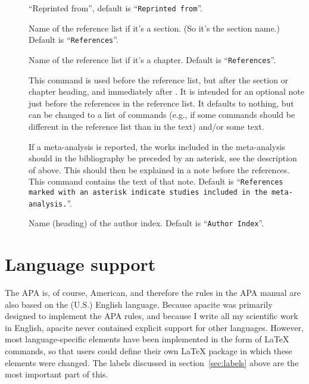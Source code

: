 \documentclass{article}
\newcommand{\pkg}[1]{\textsf{#1}}%
\newcommand{\cmd}[1]{\texttt{\string#1}}%
\begin{document}
\begin{description}
  \item[\cmd{\BREPR}] ``Reprinted from'', default is
      ``\texttt{Reprinted from}''.

  \item[\cmd{\refname}] Name of the reference list if it's a section.
      (So it's the section name.) Default is ``\verb+References+''.

  \item[\cmd{\bibname}] Name of the reference list if it's a chapter.
      Default is ``\verb+References+''.

  \item[\cmd{\bibliographyprenote}] This command is used before
      the reference list, but after the section or chapter heading,
      and immediately after \cmd{\bibliographytypesize}.
      It is intended for an optional note just before the references
      in the reference list. It defaults to nothing, but can be changed
      to a list of commands (e.g., if some commands should be different
      in the reference list than in the text) and/or some text.

  \item[\cmd{\APACmetaprenote}] If a meta-analysis is reported, the
      works included in the meta-analysis should in the bibliography be
      preceded by an asterisk, see the description of \cmd{\APACmetastar}
      above. This should then be explained in a note before the references.
      This command contains the text of that note. Default is
      ``\texttt{References marked with an asterisk indicate studies
      included in the meta-analysis.}''.

  \item[\cmd{\authorindexname}] Name (heading) of the author index.
      Default is ``\verb+Author Index+''.
\end{description}

\section{Language support}
\label{sec:compat-babel}
The APA is, of course, American, and therefore the rules in the APA manual
are also based on the (U.S.) English language. Because \pkg{apacite} was
primarily designed to implement the APA rules, and because I write all
my scientific work in English, \pkg{apacite} never contained explicit
support for other languages. However, most language-specific elements
have been implemented in the form of \LaTeX{} commands, so that users
could define their own \LaTeX{} package in which these elements were
changed. The labels discussed in section~\ref{sec:labels} above are the
most important part of this.
\end{document}
